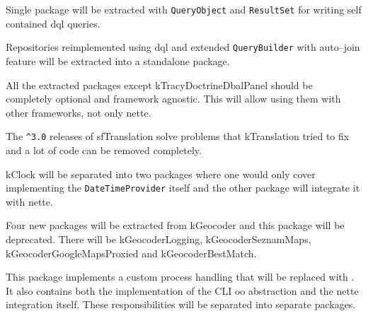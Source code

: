 Single package will be extracted with \lstinline{QueryObject} and \lstinline{ResultSet} for writing self contained \gls{dql} queries.

Repositories reimplemented using \gls{dql} and extended \lstinline{QueryBuilder} with auto--join feature will be extracted into a standalone package.

All the extracted packages except \gls{kTracyDoctrineDbalPanel} should be completely optional and framework agnostic. This will allow using them with other frameworks, not only \gls{nette}.


The \lstinline{^3.0} releases of \gls{sfTranslation} solve problems that \gls{kTranslation} tried to fix and a lot of code can be removed completely.


\gls{kClock} will be separated into two packages where one would only cover implementing the \lstinline{DateTimeProvider} itself and the other package will integrate it with \gls{nette}.


Four new packages will be extracted from \gls{kGeocoder} and this package will be deprecated. There will be \gls{kGeocoderLogging}, \gls{kGeocoderSeznamMaps}, \gls{kGeocoderGoogleMapsProxied} and \gls{kGeocoderBestMatch}.


This package implements a custom process handling that will be replaced with . It also contains both the implementation of the CLI \gls{oo} abstraction and the \gls{nette} integration itself. These responsibilities will be separated into separate packages.
